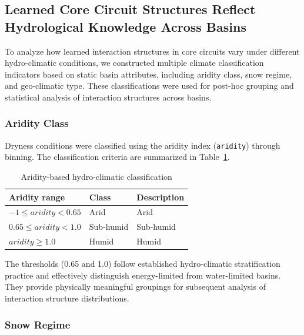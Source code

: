 \documentclass[11pt]{article}
\begin{document}
\subsection{Learned Core Circuit Structures Reflect Hydrological Knowledge Across Basins}
\label{sec:knowledge}

To analyze how learned interaction structures in core circuits vary under different hydro-climatic conditions, we constructed multiple climate classification indicators based on static basin attributes, including aridity class, snow regime, and geo-climatic type\cite{hess-camels}. These classifications were used for post-hoc grouping and statistical analysis of interaction structures across basins.

\subsubsection*{Aridity Class}

Dryness conditions were classified using the aridity index (\texttt{aridity}) through binning\cite{zomer2022version}. The classification criteria are summarized in Table~\ref{tab:aridity_class}.

\begin{table}[htbp]
    \centering
    \caption{Aridity-based hydro-climatic classification}
    \label{tab:aridity_class}
    \begin{tabular*}{\textwidth}{@{\extracolsep{\fill}}lll}
        \toprule
        \textbf{Aridity range} & \textbf{Class} & \textbf{Description} \\
        \midrule
        $-1 \le aridity < 0.65$ & Arid & Arid \\
        $0.65 \le aridity < 1.0$ & Sub-humid & Sub-humid \\
        $aridity \ge 1.0$ & Humid & Humid \\
        \bottomrule
    \end{tabular*}
\end{table}

The thresholds (0.65 and 1.0) follow established hydro-climatic stratification practice and effectively distinguish energy-limited from water-limited basins\cite{hess-24-1081-2020}. They provide physically meaningful groupings for subsequent analysis of interaction structure distributions.

\subsubsection*{Snow Regime}
\end{document}
